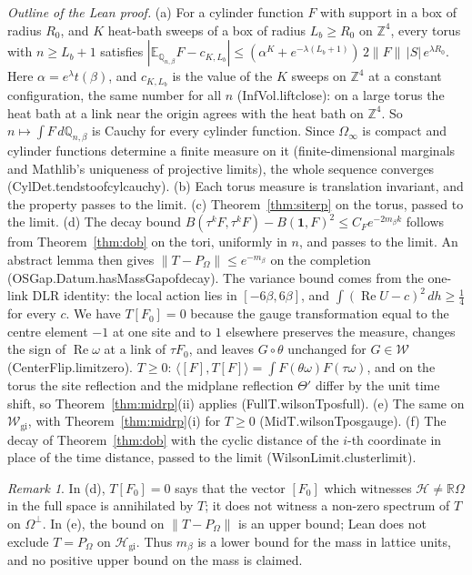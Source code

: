 \documentclass[11pt,a4paper]{article}
\theoremstyle{definition}
\theoremstyle{remark}
\newtheorem{remark}[theorem]{Remark}
\newcommand{\leanus}{\textunderscore\allowbreak{}}
\newcommand{\leandot}{.\allowbreak{}}
\newcommand{\lean}[1]{{\ttfamily\let\_\leanus #1}}
\newcommand{\Z}{\mathbb{Z}}
\newcommand{\R}{\mathbb{R}}
\renewcommand{\Re}{\operatorname{Re}}
\begin{document}
\emph{Outline of the Lean proof.} (a) For a cylinder function $F$ with support in a box of radius $R_0$, and $K$ heat-bath sweeps of a box of radius $L_b\ge R_0$ on $\Z^4$, every torus with $n\ge L_b+1$ satisfies $|\mathbb E_{\mathbb Q_{n,\beta}}F-c_{K,L_b}|\le(\alpha^K+e^{-\lambda(L_b+1)})\,2\|F\|\,|S|\,e^{\lambda R_0}$. Here $\alpha=e^\lambda t(\beta)$, and $c_{K,L_b}$ is the value of the $K$ sweeps on $\Z^4$ at a constant configuration, the same number for all $n$ (\lean{InfVol\leandot{}lift\_close}): on a large torus the heat bath at a link near the origin agrees with the heat bath on $\Z^4$. So $n\mapsto\int F\,d\mathbb Q_{n,\beta}$ is Cauchy for every cylinder function. Since $\Omega_\infty$ is compact and cylinder functions determine a finite measure on it (finite-dimensional marginals and Mathlib's uniqueness of projective limits), the whole sequence converges (\lean{CylDet\leandot{}tendsto\_of\_cyl\_cauchy}). (b) Each torus measure is translation invariant, and the property passes to the limit. (c) Theorem~\ref{thm:siterp} on the torus, passed to the limit. (d) The decay bound $B(\tau^kF,\tau^kF)-B(\mathbf 1,F)^2\le C_F e^{-2m_\beta k}$ follows from Theorem~\ref{thm:dob} on the tori, uniformly in $n$, and passes to the limit. An abstract lemma then gives $\|T-P_\Omega\|\le e^{-m_\beta}$ on the completion (\lean{OSGap\leandot{}Datum\leandot{}hasMassGap\_of\_decay}). The variance bound comes from the one-link DLR identity: the local action lies in $[-6\beta,6\beta]$, and $\int(\Re U-c)^2\,dh\ge\frac14$ for every $c$. We have $T[F_0]=0$ because the gauge transformation equal to the centre element $-1$ at one site and to $1$ elsewhere preserves the measure, changes the sign of $\Re\omega$ at a link of $\tau F_0$, and leaves $G\circ\theta$ unchanged for $G\in\mathcal W$ (\lean{CenterFlip\leandot{}limit\_zero}). $T\ge0$: $\langle[F],T[F]\rangle=\int F(\theta\omega)F(\tau\omega)$, and on the torus the site reflection and the midplane reflection $\Theta'$ differ by the unit time shift, so Theorem~\ref{thm:midrp}(ii) applies (\lean{FullT\leandot{}wilson\_Tpos\_full}). (e) The same on $\mathcal W_{\mathrm{gi}}$, with Theorem~\ref{thm:midrp}(i) for $T\ge0$ (\lean{MidT\leandot{}wilson\_Tpos\_gauge}). (f) The decay of Theorem~\ref{thm:dob} with the cyclic distance of the $i$-th coordinate in place of the time distance, passed to the limit (\lean{WilsonLimit\leandot{}cluster\_limit}).

\begin{remark}
In (d), $T[F_0]=0$ says that the vector $[F_0]$ which witnesses $\mathcal H\ne\R\Omega$ in the full space is annihilated by $T$; it does not witness a non-zero spectrum of $T$ on $\Omega^\perp$. In (e), the bound on $\|T-P_\Omega\|$ is an upper bound; Lean does not exclude $T=P_\Omega$ on $\mathcal H_{\mathrm{gi}}$. Thus $m_\beta$ is a lower bound for the mass in lattice units, and no positive upper bound on the mass is claimed.
\end{remark}
\end{document}
